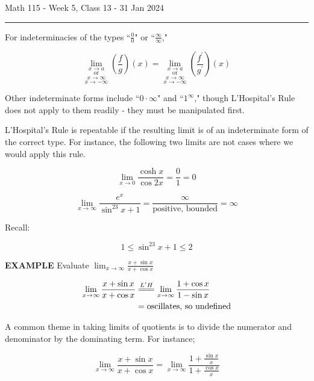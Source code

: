 \documentclass{article}
\begin{document}
Math 115 - Week 5, Class 13 - 31 Jan 2024
\hrule

\vspace{10pt}

For indeterminacies of the types ``$\frac{0}{0}$" or ``$\frac{\infty}{\infty}$,"

\[\underset{x\to-\infty}{\underset{x\to\infty}{\underset{\mbox{or}}{\underset{x\to a}{\lim}}}}\left(\frac{f}{g}\right)(x)=\underset{x\to-\infty}{\underset{x\to\infty}{\underset{\mbox{or}}{\underset{x\to a}{\lim}}}}\left(\frac{f^\prime}{g^\prime}\right)(x)\]

\vspace{10pt}

Other indeterminate forms include ``$0\cdot\infty$" and ``$1^\infty$," though L'Hospital's Rule does not apply to them readily - they must be manipulated first.

\vspace{10pt}

L'Hospital's Rule is repeatable if the resulting limit is of an indeterminate form of the correct type. For instance, the following two limits are not cases where we would apply this rule.

\[\lim_{x\to0}\frac{\cosh x}{\cos2x}=\frac{0}{1}=0\]

\[\lim_{x\to\infty}\frac{e^x}{\sin^23x+1}=\frac{\infty}{\mbox{positive, bounded}}=\infty\]

\vspace{10pt}

Recall:

\[1\leq\sin^23x+1\leq2\]

\vspace{10pt}

{\bf{}EXAMPLE} Evaluate $\displaystyle\lim_{x\to\infty}\frac{x+\sin x}{x+\cos x}$

\vspace{10pt}

\begin{align*}
\lim_{x\to\infty}\frac{x+\sin x}{x+\cos x}&\overset{L'H}{=\joinrel=\joinrel=}\lim_{x\to\infty}\frac{1+\cos x}{1-\sin x}\\
&=\mbox{oscillates, so undefined}
\end{align*}

\vspace{10pt}

A common theme in taking limits of quotients is to divide the numerator and denominator by the dominating term. For instance;

\[\lim_{x\to\infty}\frac{x+\sin x}{x+\cos x}=\lim_{x\to\infty}\frac{1+\frac{\sin x}{x}}{1+\frac{\cos x}{x}}\]
\end{document}
